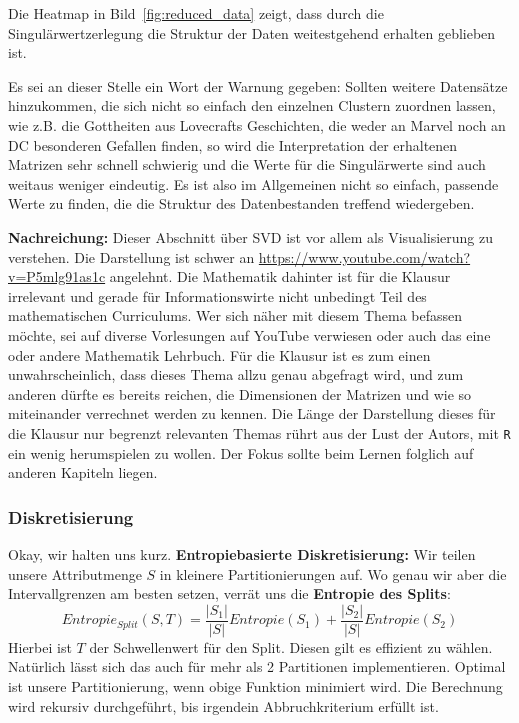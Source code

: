 Die Heatmap in Bild~\ref{fig:reduced_data} zeigt, dass durch die Singulärwertzerlegung
die Struktur der Daten weitestgehend erhalten geblieben ist.

Es sei an dieser Stelle ein Wort der Warnung gegeben: Sollten weitere Datensätze
hinzukommen, die sich nicht so einfach den einzelnen Clustern zuordnen lassen,
wie z.B. die Gottheiten aus Lovecrafts Geschichten, die weder an Marvel noch an DC
besonderen Gefallen finden, so wird die Interpretation der erhaltenen Matrizen
sehr schnell schwierig und die Werte für die Singulärwerte sind auch weitaus weniger
eindeutig. Es ist also im Allgemeinen nicht so einfach, passende Werte zu finden,
die die Struktur des Datenbestanden treffend wiedergeben.

\textbf{Nachreichung:} Dieser Abschnitt über SVD ist vor allem als
Visualisierung zu verstehen. Die Darstellung ist schwer an
\url{https://www.youtube.com/watch?v=P5mlg91as1c} angelehnt. 
Die Mathematik dahinter ist für die Klausur
irrelevant und gerade für Informationswirte nicht unbedingt Teil des mathematischen
Curriculums. Wer sich näher mit diesem Thema befassen möchte, sei auf diverse
Vorlesungen auf YouTube verwiesen oder auch das eine oder andere Mathematik
Lehrbuch. Für die Klausur ist es zum einen unwahrscheinlich, dass dieses Thema
allzu genau abgefragt wird, und zum anderen dürfte es bereits reichen, die
Dimensionen der Matrizen und wie so miteinander verrechnet werden zu kennen.
Die Länge der Darstellung dieses für die Klausur nur begrenzt relevanten Themas
rührt aus der Lust der Autors, mit \texttt{R} ein wenig herumspielen zu wollen.
Der Fokus sollte beim Lernen folglich auf anderen Kapiteln liegen.

\subsubsection{Diskretisierung}
Okay, wir halten uns kurz.  \textbf{Entropiebasierte Diskretisierung:} Wir teilen
unsere Attributmenge \(S\) in kleinere Partitionierungen auf. Wo genau wir aber
die Intervallgrenzen am besten setzen, verrät uns die \textbf{Entropie des Splits}:
\[
	Entropie_{Split}(S,T) = \frac{|S_1|}{|S|} Entropie(S_1) +
	\frac{|S_2|}{|S|} Entropie(S_2)
\]
Hierbei ist \(T\) der Schwellenwert für den Split. Diesen gilt es effizient zu wählen.
Natürlich lässt sich das auch für mehr als 2 Partitionen implementieren. Optimal ist unsere
Partitionierung, wenn obige Funktion minimiert wird. Die Berechnung wird rekursiv
durchgeführt, bis irgendein Abbruchkriterium erfüllt ist.

